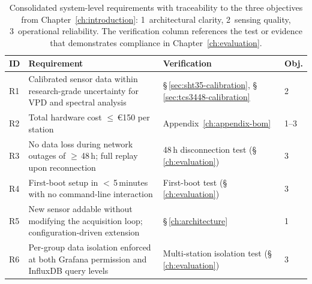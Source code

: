 \begin{table}[htbp]
\centering
\caption[System-Level Requirements Summary]{Consolidated system-level requirements with traceability to the three objectives from Chapter~\ref{ch:introduction}: 1~architectural clarity, 2~sensing quality, 3~operational reliability. The verification column references the test or evidence that demonstrates compliance in Chapter~\ref{ch:evaluation}.}
\label{tab:requirements-summary}
\small
\setlength{\tabcolsep}{5pt}
\renewcommand{\arraystretch}{1.2}
\begin{tabularx}{\textwidth}{|P{0.8cm}|X|P{2.8cm}|P{1.1cm}|}
\hline
\textbf{ID} & \textbf{Requirement} & \textbf{Verification} & \textbf{Obj.} \\
\hline
R1 & Calibrated sensor data within research-grade uncertainty for VPD and spectral analysis & §\,\ref{sec:sht35-calibration}, §\,\ref{sec:tcs3448-calibration} & 2 \\
\hline
R2 & Total hardware cost $\leq$\,€150 per station & Appendix~\ref{ch:appendix-bom} & 1--3 \\
\hline
R3 & No data loss during network outages of $\geq$\,48\,h; full replay upon reconnection & 48\,h disconnection test (§\,\ref{ch:evaluation}) & 3 \\
\hline
R4 & First-boot setup in $<$\,5\,minutes with no command-line interaction & First-boot test (§\,\ref{ch:evaluation}) & 3 \\
\hline
R5 & New sensor addable without modifying the acquisition loop; configuration-driven extension & §\,\ref{ch:architecture} & 1 \\
\hline
R6 & Per-group data isolation enforced at both Grafana permission and InfluxDB query levels & Multi-station isolation test (§\,\ref{ch:evaluation}) & 3 \\
\hline
\end{tabularx}
\end{table}

